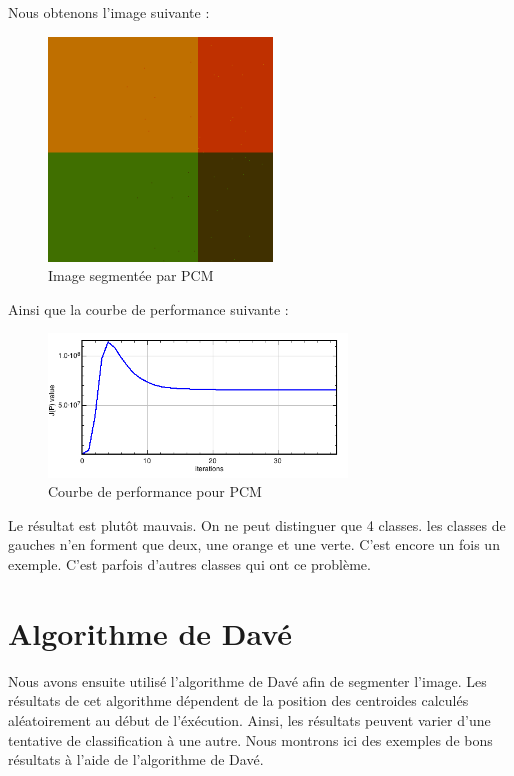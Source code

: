 \documentclass[a4paper,11pt]{article}
\begin{document}
Nous obtenons l'image suivante :

\begin{figure}[H]
\begin{center}
\includegraphics[width=225px]{../img/PCM.png}
\end{center}
\caption{Image segmentée par PCM}
\end{figure}

Ainsi que la courbe de performance suivante :

\begin{figure}[H]
\begin{center}
\includegraphics[width=300px]{../img/Perf_PCM.png}
\end{center}
\caption{Courbe de performance pour PCM}
\end{figure}

Le résultat est plutôt mauvais. On ne peut distinguer que 4 classes. les classes de gauches n'en forment que deux, une orange et une verte. C'est encore un fois un exemple. C'est parfois d'autres classes qui ont ce problème. 

\section{Algorithme de Davé}
Nous avons ensuite utilisé l'algorithme de Davé afin de segmenter l'image. Les résultats de cet algorithme dépendent de la position des centroides calculés aléatoirement au début de l'éxécution. Ainsi, les résultats peuvent varier d'une tentative de classification à une autre. Nous montrons ici des exemples de bons résultats à l'aide de l'algorithme de Davé. \\
\end{document}
